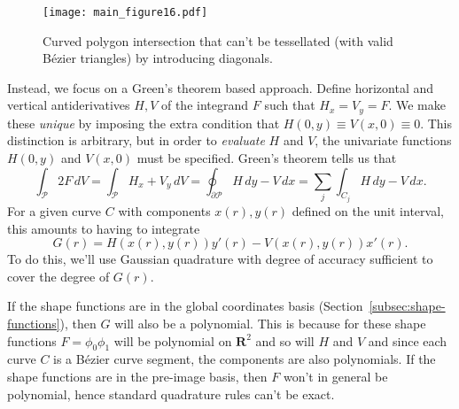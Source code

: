 \documentclass[oneside, reqno]{amsart}
\theoremstyle{definition}
\newcommand{\reals}{\mathbf{R}}
\begin{document}
\begin{figure}
  \texttt{[image: main\_figure16.pdf]}
  \centering
  \captionsetup{width=.75\linewidth}
  \caption{Curved polygon intersection that can't be tessellated
    (with valid B\'{e}zier triangles) by introducing diagonals.}
  \label{fig:bad-tessellation-required}
\end{figure}

Instead, we focus on a Green's theorem based approach.
Define horizontal and vertical antiderivatives
\(H, V\) of the integrand \(F\) such that \(H_x = V_y = F\).
We make these \emph{unique} by imposing the
extra condition that \(H(0, y) \equiv V(x, 0) \equiv 0\).
This distinction is arbitrary, but in order to \emph{evaluate}
\(H\) and \(V\), the univariate functions \(H(0, y)\) and \(V(x, 0)\)
must be specified.
Green's theorem tells us that
\begin{equation}
\int_{\mathcal{P}} 2 F \, dV =
\int_{\mathcal{P}} H_x + V_y \, dV =
\oint_{\partial \mathcal{P}} H \, dy - V \, dx =
\sum_j \int_{C_j} H \, dy - V \, dx.
\end{equation}
For a given curve \(C\) with components \(x(r), y(r)\)
defined on the unit interval, this amounts to having
to integrate
\begin{equation}
G(r) = H(x(r), y(r)) y'(r) - V(x(r), y(r)) x'(r).
\end{equation}
To do this, we'll use Gaussian
quadrature with degree of accuracy sufficient to cover the degree
of \(G(r)\).

If the shape functions are in the global coordinates basis
(Section~\ref{subsec:shape-functions}), then \(G\) will also be a polynomial.
This is because for these shape functions \(F = \phi_0 \phi_1\) will be
polynomial on \(\reals^2\) and so will \(H\) and \(V\) and since each curve
\(C\) is a B\'{e}zier curve segment, the components are also polynomials.
If the shape functions are in the pre-image basis, then \(F\) won't in general
be polynomial, hence standard quadrature rules can't be exact.
\end{document}
